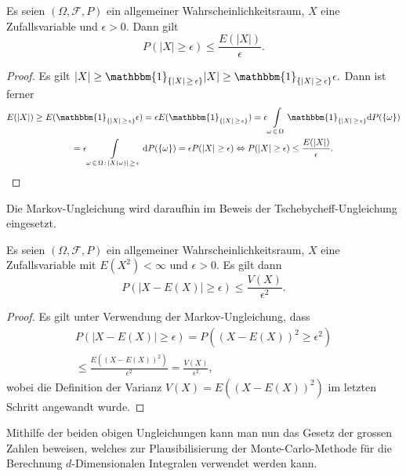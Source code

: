 \documentclass[a4paper,12pt]{article}
\begin{document}
\begin{tn}\label{Markov}
		Es seien $(\Omega, \mathcal{F},P)$ ein allgemeiner Wahrscheinlichkeitsraum, $X$ eine Zufallsvariable und $\epsilon > 0.$ Dann gilt \begin{equation}
			P(|X|\geq \epsilon) \leq \frac{E(|X|)}{\epsilon}.
		\end{equation}
\end{tn}
\begin{proof}
	Es gilt $|X| \geq \mathbbm{1}_{\{|X|\,\geq \,\epsilon\}}|X| \geq \mathbbm{1}_{\{|X|\,\geq \,\epsilon\}}\epsilon.$ Dann ist ferner \begin{gather}
		E(|X|) \geq E(\mathbbm{1}_{\{|X|\,\geq \,\epsilon\}}\epsilon) = \epsilon E(\mathbbm{1}_{\{|X|\,\geq \,\epsilon\}}) = \epsilon \int\displaylimits_{\omega \,\in \,\Omega} \mathbbm{1}_{\{|X|\,\geq \,\epsilon\}} \mathrm{d}P(\{\omega\}) \nonumber \\
		= \epsilon \int\displaylimits_{\omega \,\in\, \Omega\,:\,|X(\omega)| \,\geq \,\epsilon} \mathrm{d}P(\{\omega\})= \epsilon P(|X|\geq \epsilon) \Leftrightarrow P(|X|\geq \epsilon) \leq \frac{E(|X|)}{\epsilon}.
	\end{gather}
\end{proof}

Die Markov-Ungleichung wird daraufhin im Beweis der Tschebycheff-Ungleichung eingesetzt.

\begin{tn}\label{Tschebycheff}
	Es seien $(\Omega, \mathcal{F},P)$ ein allgemeiner Wahrscheinlichkeitsraum, $X$ eine Zufallsvariable mit $E(X^2) < \infty$ und $\epsilon > 0$. Es gilt dann \begin{equation}
		P(|X-E(X)|\geq \epsilon) \leq \frac{V(X)}{\epsilon^2}.
	\end{equation} 
\end{tn}
\begin{proof}
	Es gilt unter Verwendung der Markov-Ungleichung, dass \begin{gather}
		P(|X-E(X)|\geq \epsilon) = P((X-E(X))^2\geq \epsilon^2) \nonumber \\ \leq \frac{E((X-E(X))^2)}{\epsilon^2} = \frac{V(X)}{\epsilon^2},	\end{gather} wobei die Definition der Varianz $V(X) = E((X-E(X))^2)$ im letzten Schritt angewandt wurde.
\end{proof}

Mithilfe der beiden obigen Ungleichungen kann man nun das Gesetz der grossen Zahlen beweisen, welches zur Plausibilisierung der Monte-Carlo-Methode für die Berechnung $d$-Dimensionalen Integralen verwendet werden kann.
\end{document}
